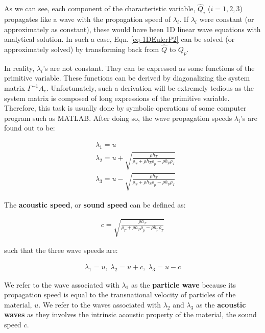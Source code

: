 \documentclass[12pt, letterpaper]{report}
\begin{document}
As we can see, each component of the characteristic variable, $\widehat{Q}_i$ ($i=1,2,3$) propagates
like a wave with the propagation speed of $\lambda_i$. If $\lambda_i$ were constant (or
approximately as constant), these would have been 1D linear wave equations with analytical solution.
In such a case, Eqn. \ref{eq-1DEulerP2} can be solved (or approximately solved) by transforming back
from $\widehat{Q}$ to $Q_p$.\paraspace

In reality, $\lambda_i$'s are not constant. They can be expressed as some functions of the primitive
variable. These functions can be derived by diagonalizing the system matrix $\Gamma^{-1}A_c$.
Unfortunately, such a derivation will be extremely tedious as the system matrix is composed of long
expressions of the primitive variable. Therefore, this task is usually done by symbolic
operations of some computer program such as MATLAB. After doing so, the wave propagation speeds
$\lambda_i$'s are found out to be:

\begin{subequations}\label{eq-wavespeed}
   \begin{align}
      &\lambda_1 = u \\
      &\lambda_2 = u + \sqrt{\frac{\rho h_T}{\rho_T + \rho h_T \rho_p - \rho h_p \rho_T}} \\
      &\lambda_3 = u - \sqrt{\frac{\rho h_T}{\rho_T + \rho h_T \rho_p - \rho h_p \rho_T}}
   \end{align}
\end{subequations}

The {\bf acoustic speed}, or {\bf sound speed} can be defined as:

\begin{align}\label{eq-soundspeed}
   c = \sqrt{\frac{\rho h_T}{\rho_T + \rho h_T \rho_p - \rho h_p \rho_T}}
\end{align}

such that the three wave speeds are:

\begin{align*}
   \lambda_1 = u, \; \lambda_2 = u+c, \; \lambda_3 = u-c
\end{align*}

We refer to the wave associated with $\lambda_1$ as the {\bf particle wave} because its propagation
speed is equal to the transnational velocity of particles of the material, $u$. We refer to the
waves associated with $\lambda_2$ and $\lambda_3$ as the {\bf acoustic waves} as they involves the
intrinsic acoustic property of the material, the sound speed $c$. \paraspace
\end{document}
